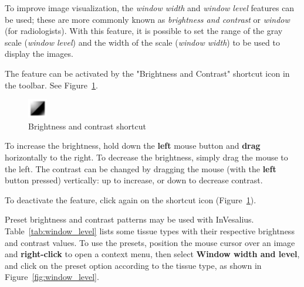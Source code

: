 To improve image visualization, the \textit{window width} and \textit{window level} features can be used; these are more commonly known as \textit{brightness and contrast} or \textit{window} (for radiologists). With this feature, it is possible to set the range of the gray scale (\textit{window level}) and the width of the scale (\textit{window width}) to be used to display the images.

The feature can be activated by the "Brightness and Contrast" shortcut icon in the toolbar. See Figure~\ref{fig:window_level_shortcut}.

\begin{figure}[!htb]
\centering
\includegraphics[scale=0.70]{../user_guide_figures/icons/tool_contrast_original.png}
\caption{Brightness and contrast shortcut}
\label{fig:window_level_shortcut}
\end{figure}

To increase the brightness, hold down the \textbf{left} mouse button and \textbf{drag} horizontally to the right. To decrease the brightness, simply drag the mouse to the left. The contrast can be changed by dragging the mouse (with the \textbf{left} button pressed) vertically: up to increase, or down to decrease contrast.

To deactivate the feature, click again on the shortcut icon (Figure~\ref{fig:window_level_shortcut}).

Preset brightness and contrast patterns may be used with InVesalius. Table~\ref{tab:window_level} lists some tissue types with their respective brightness and contrast values. To use the presets, position the mouse cursor over an image and \textbf{right-click} to open a context menu, then select \textbf{Window width and level}, and click on the preset option according to the tissue type, as shown in Figure~\ref{fig:window_level}.

